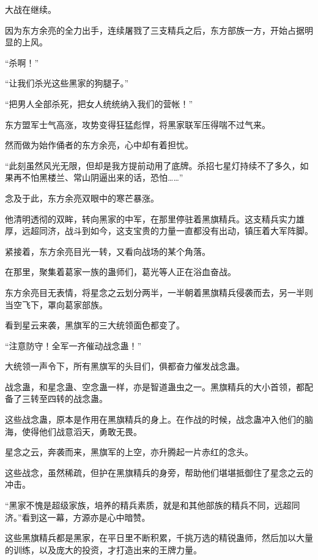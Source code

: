 
\begin{this_body}

大战在继续。

因为东方余亮的全力出手，连续屠戮了三支精兵之后，东方部族一方，开始占据明显的上风。

“杀啊！”

“让我们杀光这些黑家的狗腿子。”

“把男人全部杀死，把女人统统纳入我们的营帐！”

东方盟军士气高涨，攻势变得狂猛彪悍，将黑家联军压得喘不过气来。

然而做为始作俑者的东方余亮，心中却有着担忧。

“此刻虽然风光无限，但却是我方提前动用了底牌。杀招七星灯持续不了多久，如果再不怕黑楼兰、常山阴逼出来的话，恐怕……”

念及于此，东方余亮双眼中的寒芒暴涨。

他清明透彻的双眸，转向黑家的中军，在那里停驻着黑旗精兵。这支精兵实力雄厚，远超同济，战斗到如今，这支宝贵的力量一直都没有出动，镇压着大军阵脚。

紧接着，东方余亮目光一转，又看向战场的某个角落。

在那里，聚集着葛家一族的蛊师们，葛光等人正在浴血奋战。

东方余亮目无表情，将星念之云划分两半，一半朝着黑旗精兵侵袭而去，另一半则当空飞下，罩向葛家部族。

看到星云来袭，黑旗军的三大统领面色都变了。

“注意防守！全军一齐催动战念蛊！”

大统领一声令下，所有黑旗军的头目们，俱都奋力催发战念蛊。

战念蛊，和星念蛊、空念蛊一样，亦是智道蛊虫之一。黑旗精兵的大小首领，都配备了三转至四转的战念蛊。

这些战念蛊，原本是作用在黑旗精兵的身上。在作战的时候，战念蛊冲入他们的脑海，使得他们战意滔天，勇敢无畏。

星念之云，奔袭而来，黑旗军的上空，亦升腾起一片赤红的念头。

这些战念，虽然稀疏，但护在黑旗精兵的身旁，帮助他们堪堪抵御住了星念之云的冲击。

“黑家不愧是超级家族，培养的精兵素质，就是和其他部族的精兵不同，远超同济。”看到这一幕，方源亦是心中暗赞。

这些黑旗精兵都是黑家，在平日里不断积累，千挑万选的精锐蛊师，然后加以大量的训练，以及庞大的投资，才打造出来的王牌力量。


\end{this_body}
